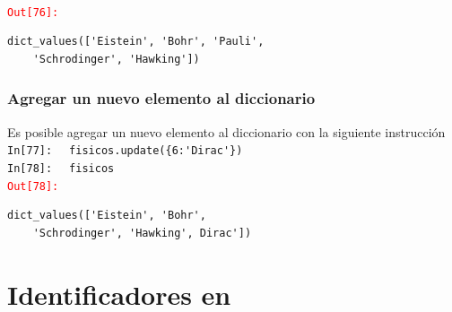 \documentclass[12pt]{beamer}
\begin{document}
{\begin{frame}[fragile]
\\
\pause
\textcolor{red}{\texttt{Out[76]: }}
\begingroup
\fontsize{12}{12}\selectfont
\begin{lstlisting}
dict_values(['Eistein', 'Bohr', 'Pauli',
	'Schrodinger', 'Hawking'])
\end{lstlisting}
\endgroup
\end{frame}
\begin{frame}[fragile]
\frametitle{Agregar un nuevo elemento al diccionario}
Es posible agregar un nuevo elemento al diccionario con la siguiente instrucción
\\
\bigskip
\textcolor{ao}{\texttt{In[77]: }} \verb| fisicos.update({6:'Dirac'})|
\\
\pause
\bigskip
\textcolor{ao}{\texttt{In[78]: }} \verb| fisicos|
\\
\pause
\textcolor{red}{\texttt{Out[78]: }}
\\
\begin{lstlisting}
dict_values(['Eistein', 'Bohr', 
	'Schrodinger', 'Hawking', Dirac'])
\end{lstlisting}
\end{frame}
\section{Identificadores en \python}
}
\end{document}

